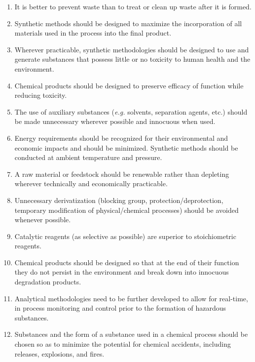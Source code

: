 \begin{enumerate}
  \item \label{itm:waste}It is better to prevent waste than to treat or clean up waste after it is formed.
  
  \item \label{itm:incorporation}Synthetic methods should be designed to
  maximize the incorporation of all materials used in the process into the final
  product.
  
  \item \label{itm:toxicity}Wherever practicable, synthetic methodologies should
  be designed to use and generate substances that possess little or no toxicity
  to human health and the environment.
  
  \item \label{itm:efficacy}Chemical products should be designed to preserve
  efficacy of function while reducing toxicity.
  
  \item \label{itm:aux}The use of auxiliary substances (\textit{e.g.} solvents,
  separation agents, etc.) should be made unnecessary wherever possible and
  innocuous when used.
  
  \item \label{itm:energy}Energy requirements should be recognized for their
  environmental and economic impacts and should be minimized. Synthetic methods
  should be conducted at ambient temperature and pressure.
  
  \item \label{itm:renewable}A raw material or feedstock should be renewable
  rather than depleting wherever technically and economically practicable.
  
  \item \label{itm:derivatization}Unnecessary derivatization (blocking group,
  protection/deprotection, temporary modification of physical/chemical
  processes) should be avoided whenever possible.
  
  \item \label{itm:catalysts}Catalytic reagents (as selective as possible) are
  superior to stoichiometric reagents.
  
  \item \label{itm:persistence}Chemical products should be designed so that at
  the end of their function they do not persist in the environment and break
  down into innocuous degradation products.
  
  \item \label{itm:monitoring}Analytical methodologies need to be further
  developed to allow for real-time, in process monitoring and control prior to
  the formation of hazardous substances.
  
  \item \label{itm:safe}Substances and the form of a substance used in a
  chemical process should be chosen so as to minimize the potential for chemical
  accidents, including releases, explosions, and fires.

\end{enumerate}

